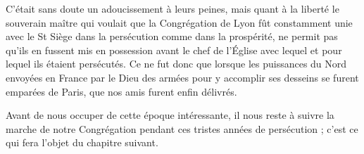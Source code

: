 C'était sans doute un adoucissement à leurs peines, mais quant à la liberté le souverain maître qui voulait que la Congrégation de Lyon fût constamment unie avec le St Siège dans la persécution comme dans la prospérité, ne permit pas qu'ils en fussent mis en possession avant le chef de l'Église avec lequel et pour lequel ils étaient persécutés. Ce ne fut donc que lorsque les puissances du Nord envoyées en France par le Dieu des armées pour y accomplir ses desseins se furent emparées de Paris, que nos amis furent enfin délivrés.

Avant de nous occuper de cette époque intéressante, il nous reste
à suivre la marche de notre Congrégation pendant ces tristes années de persécution ; c'est ce qui fera l'objet du chapitre suivant.
